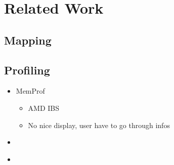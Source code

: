 \section{Related Work}
\label{sec:soa}
\subsection{Mapping}
\label{sec:soa-mapping}
\subsection{Profiling}
\label{sec:soa-profiling}

\begin{itemize}
    \item MemProf \cite{Lachaize12MemProf}
        \begin{itemize}
            \item AMD IBS
            \item No nice display, user have to go through infos
        \end{itemize}
    \item \cite{Majo13(Mis)understanding}
    \item \cite{Jiang14Understanding}
\end{itemize}
